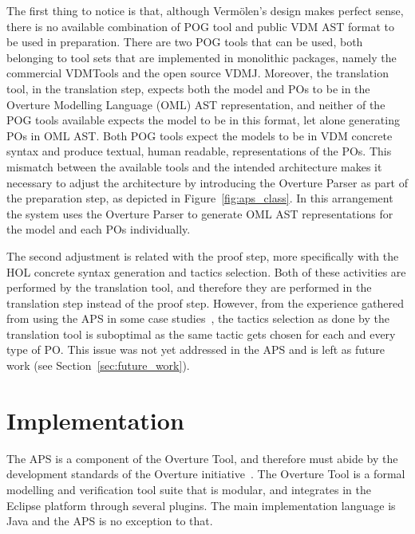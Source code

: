 \documentclass[]{article}
\begin{document}
The first thing to notice is that, although Verm\"olen's design makes perfect sense, there is no available combination of POG tool and public VDM AST format to be used in preparation.
There are two POG tools that can be used, both belonging to tool sets that are implemented in monolithic packages, namely the commercial VDMTools and the open source VDMJ.
Moreover, the translation tool, in the translation step, expects both the model and POs to be in the Overture Modelling Language (OML) AST representation, and neither of the POG tools available expects the model to be in this format, let alone generating POs in OML AST.
Both POG tools expect the models to be in VDM concrete syntax and produce textual, human readable, representations of the POs.
This mismatch between the available tools and the intended architecture makes it necessary to adjust the architecture by introducing the Overture Parser as part of the preparation step, as depicted in Figure~\ref{fig:aps_class}.
In this arrangement the system uses the Overture Parser to generate OML AST representations for the model and each POs individually.

The second adjustment is related with the proof step, more specifically with the HOL concrete syntax generation and tactics selection.
Both of these activities are performed by the translation tool, and therefore they are performed in the translation step instead of the proof step.
However, from the experience gathered from using the APS in some case studies~\cite{FerreiraSO2008,Ferreira2009,SBMF09paper}, the tactics selection as done by the translation tool is suboptimal as the same tactic gets chosen for each and every type of PO.
This issue was not yet addressed in the APS and is left as future work (see Section~\ref{sec:future_work}).

\section{Implementation}
\label{sec:implementation}

The APS is a component of the Overture Tool, and therefore must abide by the development standards of the Overture initiative~\cite{LarsenBFL08}.
The Overture Tool is a formal modelling and verification tool suite that is modular, and integrates in the Eclipse platform through several plugins.
The main implementation language is Java and the APS is no exception to that.
\end{document}
